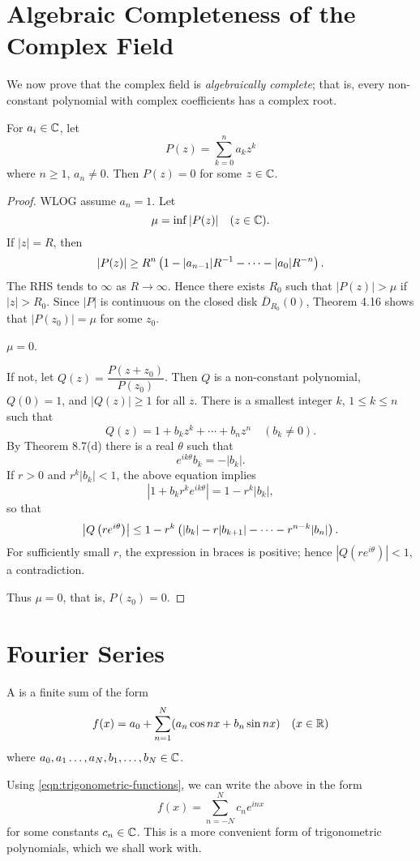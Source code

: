 \section{Algebraic Completeness of the Complex Field}
We now prove that the complex field is \emph{algebraically complete}; that is, every non-constant polynomial with complex coefficients has a complex root.

\begin{theorem}
For $a_i\in\mathbb C$, let
\[P(z)=\sum_{k=0}^n a_kz^k\]
where $n\ge1$, $a_n\neq0$. Then $P(z)=0$ for some $z\in\mathbb C$.
\end{theorem}

\begin{proof}
WLOG assume $a_n=1$. Let
\[\mu=\inf|P(z)|\quad(z\in\mathbb C).\]
If $|z|=R$, then
\[|P(z)|\ge R^n\left(1-|a_{n-1}|R^{-1}-\cdots-|a_0|R^{-n}\right).\]
The RHS tends to $\infty$ as $R\to\infty$. Hence there exists $R_0$ such that $|P(z)|>\mu$ if $|z|>R_0$. Since $|P|$ is continuous on the closed disk $\overline{D}_{R_0}(0)$, Theorem 4.16 shows that $|P(z_0)|=\mu$ for some $z_0$.

\begin{claim}
$\mu=0$.
\end{claim}
If not, let $Q(z)=\dfrac{P(z+z_0)}{P(z_0)}$. Then $Q$ is a non-constant polynomial, $Q(0)=1$, and $|Q(z)|\ge1$ for all $z$. There is a smallest integer $k$, $1\le k\le n$ such that
\[Q(z)=1+b_kz^k+\cdots+b_nz^n\quad(b_k\neq0).\]
By Theorem 8.7(d) there is a real $\theta$ such that
\[e^{ik\theta}b_k=-|b_k|.\]
If $r>0$ and $r^k|b_k|<1$, the above equation implies
\[|1+b_kr^ke^{ik\theta}|=1-r^k|b_k|,\]
so that
\[\left|Q\left(re^{i\theta}\right)\right|\le 1-r^k\left(|b_k|-r|b_{k+1}|-\cdots-r^{n-k}|b_n|\right).\]
For sufficiently small $r$, the expression in braces is positive; hence $|Q(re^{i\theta})|<1$, a contradiction.

Thus $\mu=0$, that is, $P(z_0)=0$.
\end{proof}
\pagebreak

\section{Fourier Series}
\begin{definition}
A  is a finite sum of the form
\[f(x)=a_0+\sum_{n=1}^{N}(a_n\cos nx+b_n\sin nx)\quad(x\in\mathbb R)\]
where $a_0,a_1\dots,a_N,b_1,\dots,b_N\in\mathbb C$.
\end{definition}

Using \eqref{eqn:trigonometric-functions}, we can write the above in the form
\[f(x)=\sum_{n=-N}^N c_ne^{inx}\]
for some constants $c_n\in\mathbb C$. This is a more convenient form of trigonometric polynomials, which we shall work with.

